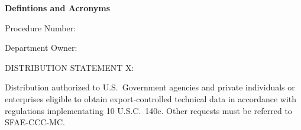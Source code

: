 \begin{titlepage}

    \textbf{Defintions and Acronyms}

    \vspace*{1in}

    \begin{flushright}
        {\Huge\textbf{\titleStr}}

        \vspace*{1ex}

        {\Large Procedure Number:~\procedureNumber}

        \vspace*{1ex}

        {\Large Department Owner:~\departmentOwner}
    \end{flushright}
    \vspace{4in}



    DISTRIBUTION STATEMENT X:

    Distribution authorized to U.S.\ Government agencies and private individuals or
    enterprises eligible to obtain export-controlled technical data in accordance with
    regulations implementating 10 U.S.C.\ 140c. Other requests must be referred to
    SFAE-CCC-MC.


\end{titlepage}
